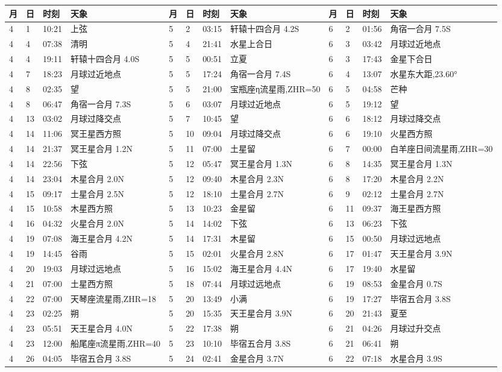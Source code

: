 \begin{tabular}{llll|llll|llll}
\hline
	月 & 日 & 时刻 & 天象 &         %
	月 & 日 & 时刻 & 天象 &
	月 & 日 & 时刻 & 天象 \tabularnewline
\hline
4 & 1 & 10:21 & 上弦 & 5 & 2 & 03:15 & 轩辕十四合月 4.2S & 6 & 2 & 01:56 & 角宿一合月 7.5S \tabularnewline
4 & 4 & 07:38 & 清明 & 5 & 4 & 21:41 & 水星上合日 & 6 & 3 & 03:42 & 月球过近地点 \tabularnewline
4 & 4 & 19:11 & 轩辕十四合月 4.0S & 5 & 5 & 00:51 & 立夏 & 6 & 3 & 17:43 & 金星下合日 \tabularnewline
4 & 7 & 18:23 & 月球过近地点 & 5 & 5 & 17:24 & 角宿一合月 7.4S & 6 & 4 & 13:07 & 水星东大距,23.60° \tabularnewline
4 & 8 & 02:35 & 望 & 5 & 5 & 21:00 & 宝瓶座η流星雨,ZHR=50 & 6 & 5 & 04:58 & 芒种 \tabularnewline
4 & 8 & 06:47 & 角宿一合月 7.3S & 5 & 6 & 03:07 & 月球过近地点 & 6 & 5 & 19:12 & 望 \tabularnewline
4 & 13 & 03:02 & 月球过降交点 & 5 & 7 & 10:45 & 望 & 6 & 6 & 18:12 & 月球过降交点 \tabularnewline
4 & 14 & 11:06 & 冥王星西方照 & 5 & 10 & 09:04 & 月球过降交点 & 6 & 6 & 19:10 & 火星西方照 \tabularnewline
4 & 14 & 21:37 & 冥王星合月 1.2N & 5 & 11 & 07:00 & 土星留 & 6 & 7 & 00:00 & 白羊座日间流星雨,ZHR=30 \tabularnewline
4 & 14 & 22:56 & 下弦 & 5 & 12 & 05:47 & 冥王星合月 1.3N & 6 & 8 & 14:35 & 冥王星合月 1.3N \tabularnewline
4 & 14 & 23:04 & 木星合月 2.0N & 5 & 12 & 09:40 & 木星合月 2.3N & 6 & 8 & 17:20 & 木星合月 2.2N \tabularnewline
4 & 15 & 09:17 & 土星合月 2.5N & 5 & 12 & 18:10 & 土星合月 2.7N & 6 & 9 & 02:12 & 土星合月 2.7N \tabularnewline
4 & 15 & 10:58 & 木星西方照 & 5 & 13 & 10:23 & 金星留 & 6 & 11 & 09:37 & 海王星西方照 \tabularnewline
4 & 16 & 04:32 & 火星合月 2.0N & 5 & 14 & 14:02 & 下弦 & 6 & 13 & 06:23 & 下弦 \tabularnewline
4 & 19 & 07:08 & 海王星合月 4.2N & 5 & 14 & 17:31 & 木星留 & 6 & 15 & 00:50 & 月球过远地点 \tabularnewline
4 & 19 & 14:45 & 谷雨 & 5 & 15 & 02:01 & 火星合月 2.8N & 6 & 17 & 01:47 & 天王星合月 3.9N \tabularnewline
4 & 20 & 19:03 & 月球过远地点 & 5 & 16 & 15:02 & 海王星合月 4.4N & 6 & 17 & 19:40 & 水星留 \tabularnewline
4 & 21 & 07:00 & 土星西方照 & 5 & 18 & 07:44 & 月球过远地点 & 6 & 19 & 08:53 & 金星合月 0.7S \tabularnewline
4 & 22 & 07:00 & 天琴座流星雨,ZHR=18 & 5 & 20 & 13:49 & 小满 & 6 & 19 & 17:27 & 毕宿五合月 3.8S \tabularnewline
4 & 23 & 02:25 & 朔 & 5 & 20 & 15:35 & 天王星合月 3.9N & 6 & 20 & 21:43 & 夏至 \tabularnewline
4 & 23 & 05:51 & 天王星合月 4.0N & 5 & 22 & 17:38 & 朔 & 6 & 21 & 04:26 & 月球过升交点 \tabularnewline
4 & 23 & 12:00 & 船尾座π流星雨,ZHR=40 & 5 & 23 & 10:10 & 毕宿五合月 3.8S & 6 & 21 & 06:41 & 朔 \tabularnewline
4 & 26 & 04:05 & 毕宿五合月 3.8S & 5 & 24 & 02:41 & 金星合月 3.7N & 6 & 22 & 07:18 & 水星合月 3.9S \tabularnewline

\end{tabular}
